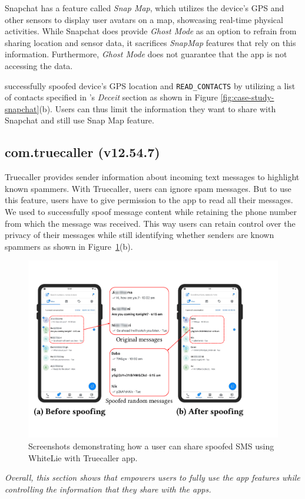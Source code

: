 Snapchat has a feature called \textit{Snap Map}, which utilizes the device's GPS and other sensors to display user avatars on a map, showcasing real-time physical activities. While Snapchat does provide \textit{Ghost Mode} as an option to refrain from sharing location and sensor data, it sacrifices \textit{SnapMap} features that rely on this information. Furthermore, \textit{Ghost Mode} does not guarantee that the app is not accessing the data. 

\framework{} successfully spoofed device's GPS location and \texttt{READ\_CONTACTS} by utilizing a list of contacts specified in \framework{}'s \textit{Deceit} section as shown in Figure \ref{fig:case-study-snapchat}(b). Users can thus limit the information they want to share with Snapchat and still use Snap Map feature.

\subsection{com.truecaller (v12.54.7)}
\label{sec:tc_case_study}
Truecaller provides sender information about incoming text messages to highlight known spammers. With Truecaller, users can ignore spam messages. But to use this feature, users have to give permission to the app to read all their messages. We used \framework{} to successfully spoof message content while retaining the phone number from which the message was received. This way users can retain control over the privacy of their messages while still identifying whether senders are known spammers as shown in
Figure~\ref{fig:case-study-truecaller}(b).

\begin{figure}[t]\centering
    \includegraphics[width=0.75\linewidth]{Figures/Case Studies/truecaller_screenshots.pdf}
    \caption{Screenshots demonstrating how a user can share spoofed SMS using WhiteLie with Truecaller app.}
    \label{fig:case-study-truecaller}
\end{figure}

\textit{Overall, this section shows that \framework{} empowers users to fully use the app features while controlling the information that they share with the apps.}
